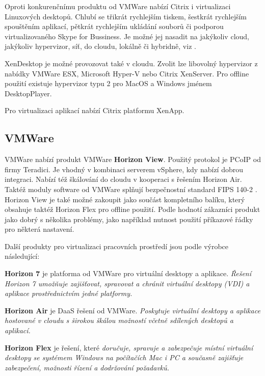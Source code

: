 Oproti konkurenčnímu produktu od VMWare nabízí Citrix i virtualizaci Linuxových desktopů. Chlubí se třikrát rychlejším tiskem, šestkrát rychlejším spouštěním aplikací, pětkrát rychlejším ukládání souborů či podporou virtualizovaného Skype for Bussiness. Je možné jej nasadit na jakýkoliv cloud, jakýkoliv hypervizor, síť, do cloudu, lokálně či hybridně, viz \cite{CitrixInfo, CitrixPaper}.%

XenDesktop je možné provozovat také v cloudu. Zvolit lze libovolný hypervizor z nabídky VMWare ESX, Microsoft Hyper-V nebo Citrix XenServer. Pro offline použití existuje hypervizor typu 2 pro MacOS a Windows jménem DesktopPlayer. 

Pro virtualizaci aplikací nabízí Citrix platformu XenApp.


\subsection{VMWare}
VMWare nabízí produkt VMWare \textbf{Horizon View}. Použitý protokol je PCoIP od firmy Teradici. Je vhodný v kombinaci serverem vSphere, kdy nabízí dobrou integraci. Nabízí též škálování do cloudu v kooperaci s řešením Horizon Air. Taktéž moduly software od VMWare splňují bezpečnostní standard FIPS 140-2 \cite{VMFIPS}. Horizon View je také možné zakoupit jako součást kompletního balíku, který obsahuje taktéž Horizon Flex pro offline použití. Podle \cite{ForresterWave} hodnotí zákazníci produkt jako dobrý s několika problémy, jako například nutnost použití příkazové řádky pro některá nastavení.

Další produkty pro virtualizaci pracovních prostředí jsou podle výrobce \cite{VMProdukty} následující:


\textbf{Horizon 7} je platforma od VMWare pro virtuální desktopy a aplikace. \textit{Řešení Horizon 7 umožňuje zajišťovat, spravovat a chránit virtuální desktopy (VDI) a aplikace prostřednictvím jedné platformy.}

\textbf{Horizon Air} je DaaS řešení od VMWare. \textit{Poskytuje virtuální desktopy a aplikace hostované v cloudu s širokou škálou možností včetně sdílených desktopů a aplikací.}

\textbf{Horizon Flex} je řešení, které \textit{doručuje, spravuje a zabezpečuje místní virtuální desktopy se systémem Windows na počítačích Mac i PC a současně zajišťuje zabezpečení, možnosti řízení a dodržování požadavků.}


